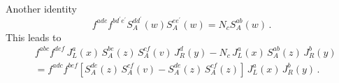 \documentclass[11pt,a4paper]{article}
\begin{document}
Another identity 
\begin{equation}%
f^{ade}f^{bd^{\prime}e^{\prime}}S_{A}^{dd^{\prime}}(w)S_{A}^{ee^{\prime}}(w)=
N_{c}S_{A}^{ab}(w)\,.
  \end{equation}
This leads to
\begin{equation}\begin{split}
&f^{abc}f^{def}\, J_{L}^{a}(x)\, S_{A}^{be}(z)\, S_{A}^{cf}(v)\, J_{R}^{d}(y)-N_{c}\, J_{L}^{a}(x)\, S_{A}^{ab}(z)\, J_{R}^{b}(y)\\
&= f^{adc}f^{bef}\left[S_{A}^{de}(z)\, S_{A}^{cf}(v)-S_{A}^{de}(z)\, S_{A}^{cf}(z)\right]\, J_{L}^{a}(x)\, J_{R}^{b}(y)\,. \\
   \end{split}\end{equation}
\end{document}
